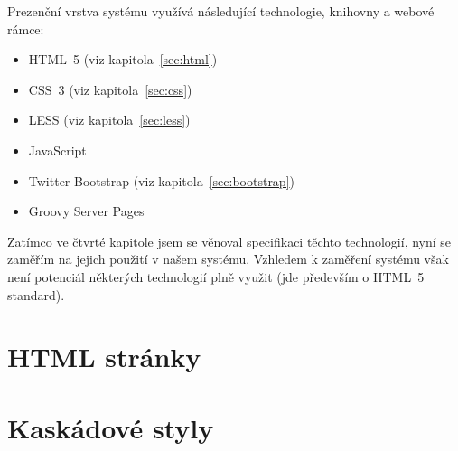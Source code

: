 Prezenční vrstva systému využívá následující technologie, knihovny a webové rámce:

\begin{itemize}
    \item HTML~5 (viz kapitola~\ref{sec:html})
    \item CSS~3 (viz kapitola~\ref{sec:css})
    \item LESS (viz kapitola~\ref{sec:less})
    \item JavaScript\footnotemark[1]
    \item Twitter Bootstrap (viz kapitola~\ref{sec:bootstrap})
    \item Groovy Server Pages
\end{itemize}

Zatímco ve čtvrté kapitole jsem se věnoval specifikaci těchto technologií, nyní se zaměřím na jejich použití v našem systému. Vzhledem k zaměření systému však není potenciál některých technologií plně využit (jde především o HTML~5 standard).


\section{HTML stránky}
\section{Kaskádové styly}
